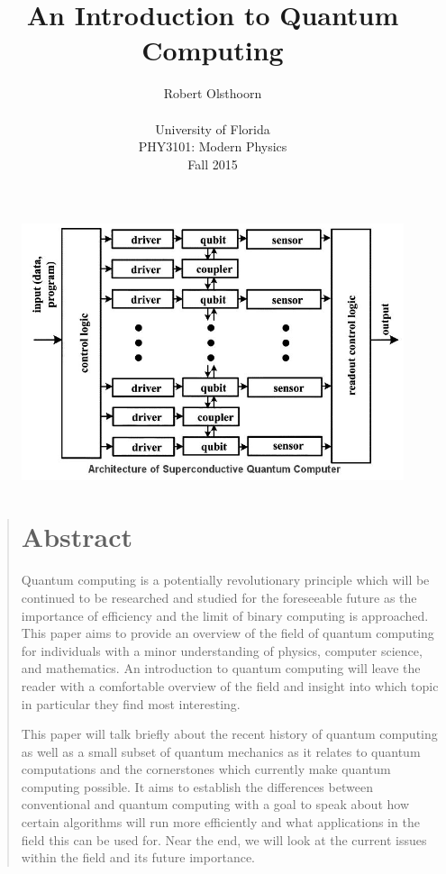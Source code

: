\documentclass[12pt]{article}
\title{An Introduction to Quantum Computing}
\author
{Robert Olsthoorn\\
\\
\normalsize{University of Florida}\\
\normalsize{PHY3101: Modern Physics}\\
\normalsize{Fall 2015}\\
}
\date{}
\newenvironment{sciabstract}{%
\begin{quote} \bf}
{\end{quote}}
\begin{document}
 





\begin{figure}
\includegraphics[scale=.5]{superconductive}
\centering
\end{figure}

\maketitle 


\newpage

\begin{sciabstract}
\section*{Abstract}
Quantum computing is a potentially revolutionary principle which will be continued to be researched and studied for the foreseeable future as the importance of efficiency and the limit of binary computing is approached. This paper aims to provide an overview of the field of quantum computing for individuals with a minor understanding of physics, computer science, and mathematics. An introduction to quantum computing will leave the reader with a comfortable overview of the field and insight into which topic in particular they find most interesting.\par
This paper will talk briefly about the recent history of quantum computing as well as a small subset of quantum mechanics as it relates to quantum computations and the cornerstones which currently make quantum computing possible. It aims to establish the differences between conventional and quantum computing with a goal to speak about how certain algorithms will run more efficiently and what applications in the field this can be used for. Near the end, we will look at the current issues within the field and its future importance.

\end{sciabstract}
\end{document}
